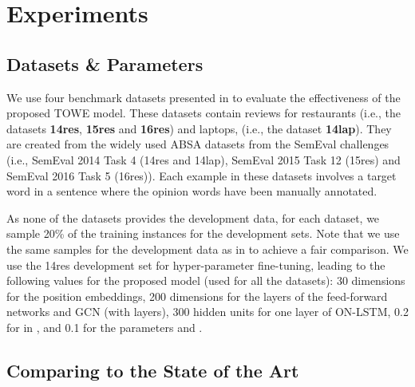 \documentclass[11pt,a4paper]{article}
\begin{document}
\section{Experiments}
\subsection{Datasets \& Parameters}


We use four benchmark datasets presented in \citep{fan2019target} to evaluate the effectiveness of the proposed TOWE model. These datasets contain reviews for restaurants (i.e., the datasets {\bf 14res}, {\bf 15res} and {\bf 16res}) and laptops, (i.e., the dataset {\bf 14lap}). They are created from the widely used ABSA datasets from the SemEval challenges (i.e., SemEval 2014 Task 4 (14res and 14lap), SemEval 2015 Task 12 (15res) and SemEval 2016 Task 5 (16res)). Each example in these datasets involves a target word in a sentence where the opinion words have been manually annotated. 









As none of the datasets provides the development data, for each dataset, we sample 20\% of the training instances for the development sets. Note that we use the same samples for the development data as in \citep{fan2019target} to achieve a fair comparison. We use the 14res development set for hyper-parameter fine-tuning, leading to the following values for the proposed model (used for all the datasets): 30 dimensions for the position embeddings, 200 dimensions for the layers of the feed-forward networks and GCN (with  layers), 300 hidden units for one layer of ON-LSTM, 0.2 for  in , and 0.1 for the parameters  and .











\subsection{Comparing to the State of the Art}
\end{document}
